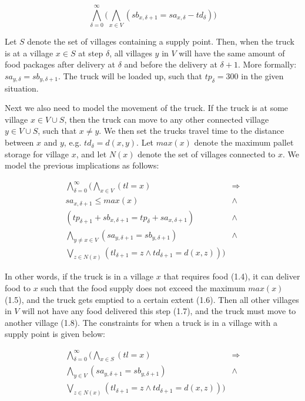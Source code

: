 \begin{equation}
    \label{eqn:5_consumption}
    \bigwedge^{\infty}_{\delta=0}\bigg(\bigwedge_{x \in V} (sb_{x, \delta+1} = sa_{x, \delta} - td_{\delta})\bigg)
\end{equation}

Let $S$ denote the set of villages containing a supply point. Then, when the truck is at a village $x \in S$ at step $\delta$, all villages $y$ in $V$ will have the same amount of food packages after delivery at $\delta$ and before the delivery at $\delta + 1$. More formally: $sa_{y, \delta} = sb_{y, \delta+1}$. The truck will be loaded up, such that $tp_{\delta} = 300$ in the given situation. 

Next we also need to model the movement of the truck. If the truck is at some village $x \in V \cup S$, then the truck can move to any other connected village $y \in V \cup S$, such that $x \not= y$. We then set the trucks travel time to the distance between $x$ and $y$, e.g. $td_{\delta} = d(x,y)$. Let $max(x)$ denote the maximum pallet storage for village $x$, and let $N(x)$ denote the set of villages connected to $x$. We model the previous implications as follows:

\begin{align}
    \label{eqn:5_citystop_consume}
    \bigwedge^{\infty}_{\delta=0}\bigg(\bigwedge_{x \in V} (tl = x) & \Rightarrow \\ 
    sa_{x,\delta+1} \leq max(x) & \wedge \\ 
    (tp_{\delta+1} + sb_{x, \delta+1} = tp_{\delta} + sa_{x, \delta+1}) & \wedge \\ 
    \bigwedge_{y\not=x \in V}(sa_{y, \delta+1} = sb_{y, \delta+1}) & \wedge \\
    \bigvee_{z \in N(x)} (tl_{\delta+1} = z \wedge td_{\delta+1} = d(x,z))
    \bigg)
\end{align}

In other words, if the truck is in a village $x$ that requires food (1.4), it can deliver food to $x$ such that the food supply does not exceed the maximum $max(x)$ (1.5), and the truck gets emptied to a certain extent (1.6). Then all other villages in $V$ will not have any food delivered this step (1.7), and the truck must move to another village (1.8).
The constraints for when a truck is in a village with a supply point is given below:

\begin{align}
    \label{eqn:5_citystop_supply}
    \bigwedge^{\infty}_{\delta=0}\bigg(\bigwedge_{x \in S} (tl = x) & \Rightarrow \\
    \bigwedge_{y \in V}(sa_{y, \delta+1} = sb_{y, \delta+1}) & \wedge \\
    \bigvee_{z \in N(x)} (tl_{\delta+1} = z \wedge td_{\delta+1} = d(x,z))
    \bigg)
\end{align}

